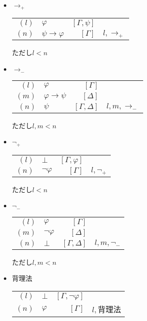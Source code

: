 \documentclass[10pt,b5paper,papersize,dvipdfmx]{jsbook}
\begin{document}
\begin{itemize}
\begin{itemize}
\item $\to_+$
\begin{table}[H]
\begin{center}
\begin{tabular}{rlrl}
$(l)$&$\varphi$&$[\Gamma,\psi]$& \\
$(n)$&$\psi \to \varphi$&$[\Gamma]$&$l,\to_+$ \\
\end{tabular}
\end{center}
\end{table}
ただし$l<n$
\item $\to_-$
\begin{table}[H]
\begin{center}
\begin{tabular}{rlrl}
$(l)$&$\varphi$&$[\Gamma]$& \\
$(m)$&$\varphi \to \psi$&$[\Delta]$& \\
$(n)$&$\psi$&$[\Gamma,\Delta]$&$l,m,\to_-$
\end{tabular}
\end{center}
\end{table}
ただし$l,m<n$
\item $\lnot_+$
\begin{table}[H]
\begin{center}
\begin{tabular}{rlrl}
$(l)$&$\bot$&$[\Gamma,\varphi]$& \\
$(n)$&$\lnot \varphi$&$[\Gamma]$&$l,\lnot_+$
\end{tabular}
\end{center}
\end{table}
ただし$l<n$
\item $\lnot_-$
\begin{table}[H]
\begin{center}
\begin{tabular}{rlrl}
$(l)$&$\varphi$&$[\Gamma]$& \\
$(m)$&$\lnot \varphi$&$[\Delta]$& \\
$(n)$&$\bot$&$[\Gamma,\Delta]$&$l,m,\lnot_-$
\end{tabular}
\end{center}
\end{table}
ただし$l,m<n$
\item 背理法
\begin{table}[H]
\begin{center}
\begin{tabular}{rlrl}
$(l)$&$\bot$&$[\Gamma,\lnot \varphi]$& \\
$(n)$&$\varphi$&$[\Gamma]$&$l,$背理法

\end{tabular}
\end{center}
\end{table}
\end{itemize}
\end{itemize}
\end{document}
